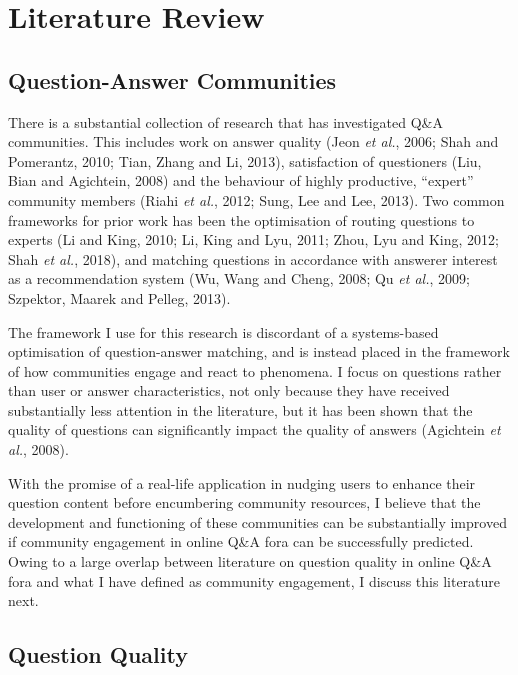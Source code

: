 \documentclass[11pt,preprint, authoryear]{article}
\numberwithin{equation}{section}
\begin{document}
\newpage

\section{\texorpdfstring{Literature Review
\label{Lit}}{Literature Review }}\label{literature-review}

\subsection{Question-Answer
Communities}\label{question-answer-communities}

There is a substantial collection of research that has investigated Q\&A
communities. This includes work on answer quality (Jeon \emph{et al.},
2006; Shah and Pomerantz, 2010; Tian, Zhang and Li, 2013), satisfaction
of questioners (Liu, Bian and Agichtein, 2008) and the behaviour of
highly productive, ``expert'' community members (Riahi \emph{et al.},
2012; Sung, Lee and Lee, 2013). Two common frameworks for prior work has
been the optimisation of routing questions to experts (Li and King,
2010; Li, King and Lyu, 2011; Zhou, Lyu and King, 2012; Shah \emph{et
al.}, 2018), and matching questions in accordance with answerer interest
as a recommendation system (Wu, Wang and Cheng, 2008; Qu \emph{et al.},
2009; Szpektor, Maarek and Pelleg, 2013).

The framework I use for this research is discordant of a systems-based
optimisation of question-answer matching, and is instead placed in the
framework of how communities engage and react to phenomena. I focus on
questions rather than user or answer characteristics, not only because
they have received substantially less attention in the literature, but
it has been shown that the quality of questions can significantly impact
the quality of answers (Agichtein \emph{et al.}, 2008).

With the promise of a real-life application in nudging users to enhance
their question content before encumbering community resources, I believe
that the development and functioning of these communities can be
substantially improved if community engagement in online Q\&A fora can
be successfully predicted. Owing to a large overlap between literature
on question quality in online Q\&A fora and what I have defined as
community engagement, I discuss this literature next.

\subsection{Question Quality}\label{question-quality}
\end{document}
